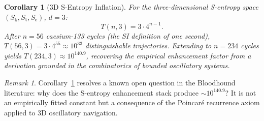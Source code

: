 \documentclass[twocolumn,11pt,a4paper]{article}
\theoremstyle{plain}
\newtheorem{corollary}[theorem]{Corollary}
\theoremstyle{definition}
\theoremstyle{remark}
\newtheorem{remark}[theorem]{Remark}
\newcommand{\Sk}{S_{\mathrm{k}}}
\newcommand{\St}{S_{\mathrm{t}}}
\newcommand{\Se}{S_{\mathrm{e}}}
\begin{document}
\begin{corollary}[3D S-Entropy Inflation]
\label{cor:3d_inflation}
For the three-dimensional S-entropy space $(\Sk,\St,\Se)$, $d=3$:
\begin{equation}
  T(n,3) = 3\cdot 4^{n-1}.
\end{equation}
After $n = 56$ caesium-133 cycles (the SI definition of one second), $T(56,3) = 3\cdot 4^{55} \approx 10^{33}$ distinguishable trajectories.  Extending to $n = 234$ cycles yields $T(234,3) \approx 10^{140.9}$, recovering the empirical enhancement factor from a derivation grounded in the combinatorics of bounded oscillatory systems.
\end{corollary}

\begin{remark}
Corollary~\ref{cor:3d_inflation} resolves a known open question in the Bloodhound literature: why does the S-entropy enhancement stack produce $\sim 10^{140.9}$?  It is not an empirically fitted constant but a consequence of the Poincar\'e recurrence axiom applied to 3D oscillatory navigation.
\end{remark}
\end{document}
